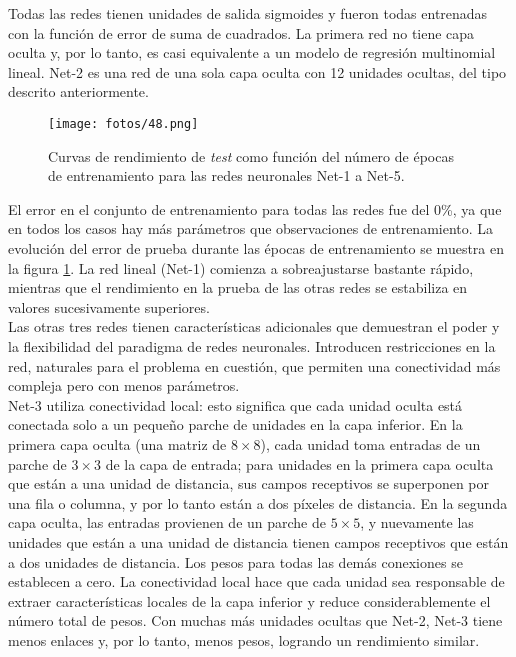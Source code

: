 Todas las redes tienen unidades de salida sigmoides y fueron todas entrenadas con la función de error de suma de cuadrados. La primera red no tiene capa oculta y, por lo tanto, es casi equivalente a un modelo de regresión multinomial lineal. Net-2 es una red de una sola capa oculta con 12 unidades ocultas, del tipo descrito anteriormente.

\begin{figure}[h]
\centering
\texttt{[image: fotos/48.png]}
\caption{Curvas de rendimiento de \textit{test} como función del número de épocas de entrenamiento para las redes neuronales Net-1 a Net-5.}
\label{fig:7.9}
\end{figure}

El error en el conjunto de entrenamiento para todas las redes fue del 0\%, ya que en todos los casos hay más parámetros que observaciones de entrenamiento. La evolución del error de prueba durante las épocas de entrenamiento se muestra en la figura \ref{fig:7.9}. La red lineal (Net-1) comienza a sobreajustarse bastante rápido, mientras que el rendimiento en la prueba de las otras redes se estabiliza en valores sucesivamente superiores. \\

Las otras tres redes tienen características adicionales que demuestran el poder y la flexibilidad del paradigma de redes neuronales. Introducen restricciones en la red, naturales para el problema en cuestión, que permiten una conectividad más compleja pero con menos parámetros. \\

Net-3 utiliza conectividad local: esto significa que cada unidad oculta está conectada solo a un pequeño parche de unidades en la capa inferior. En la primera capa oculta (una matriz de $8 \times 8$), cada unidad toma entradas de un parche de $3 \times 3$ de la capa de entrada; para unidades en la primera capa oculta que están a una unidad de distancia, sus campos receptivos se superponen por una fila o columna, y por lo tanto están a dos píxeles de distancia. En la segunda capa oculta, las entradas provienen de un parche de $5 \times 5$, y nuevamente las unidades que están a una unidad de distancia tienen campos receptivos que están a dos unidades de distancia. Los pesos para todas las demás conexiones se establecen a cero. La conectividad local hace que cada unidad sea responsable de extraer características locales de la capa inferior y reduce considerablemente el número total de pesos. Con muchas más unidades ocultas que Net-2, Net-3 tiene menos enlaces y, por lo tanto, menos pesos, logrando un rendimiento similar. \\

